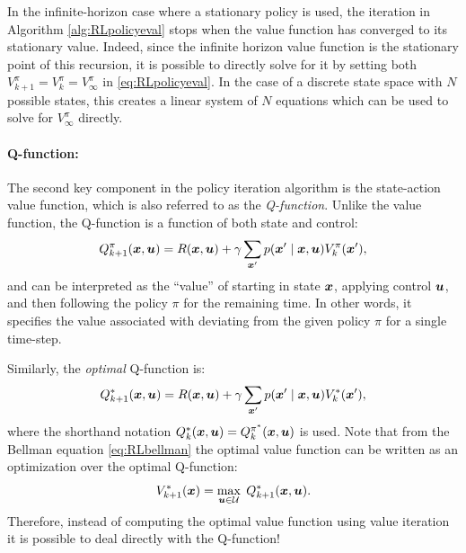 In the infinite-horizon case where a stationary policy is used, the iteration in Algorithm \ref{alg:RLpolicyeval} stops when the value function has converged to its stationary value. 
Indeed, since the infinite horizon value function is the stationary point of this recursion, it is possible to directly solve for it by setting both $V^\pi_{k+1} = V^\pi_{k} = V^\pi_\infty$ in \eqref{eq:RLpolicyeval}. In the case of a discrete state space with $N$ possible states, this creates a linear system of $N$ equations which can be used to solve for $V^\pi_\infty$ directly.

\paragraph{Q-function:}
The second key component in the policy iteration algorithm is the state-action value function, which is also referred to as the \textit{Q-function}. Unlike the value function, the Q-function is a function of both state and control:
\begin{equation} \label{eq:RLqfunc}
Q^\pi_{k+1}(\bm{x},\bm{u}) = R(\bm{x}, \bm{u}) + \gamma \sum_{\bm{x}'} p(\bm{x}' \mid \bm{x}, \bm{u}) V^\pi_{k}(\bm{x}'),
\end{equation}
and can be interpreted as the ``value'' of starting in state $\bm{x}$, applying control $\bm{u}$, and then following the policy $\pi$ for the remaining time. In other words, it specifies the value associated with deviating from the given policy $\pi$ for a single time-step.

Similarly, the \textit{optimal} Q-function is:
\begin{equation*}
Q^*_{k+1}(\bm{x},\bm{u}) = R(\bm{x}, \bm{u}) + \gamma \sum_{\bm{x}'} p(\bm{x}' \mid \bm{x}, \bm{u}) V^*_{k}(\bm{x}'),
\end{equation*}
where the shorthand notation $Q^*_{k}(\bm{x},\bm{u}) = Q^{\pi^*}_{k}(\bm{x},\bm{u})$ is used.
Note that from the Bellman equation \eqref{eq:RLbellman} the optimal value function can be written as an optimization over the optimal Q-function:
\begin{equation*}
V^*_{k+1}(\bm{x}) = \underset{\bm{u} \in \mathcal{U}}{\max} \:\: Q^*_{k+1}(\bm{x},\bm{u}).
\end{equation*}
Therefore, instead of computing the optimal value function using value iteration it is possible to deal directly with the Q-function!

